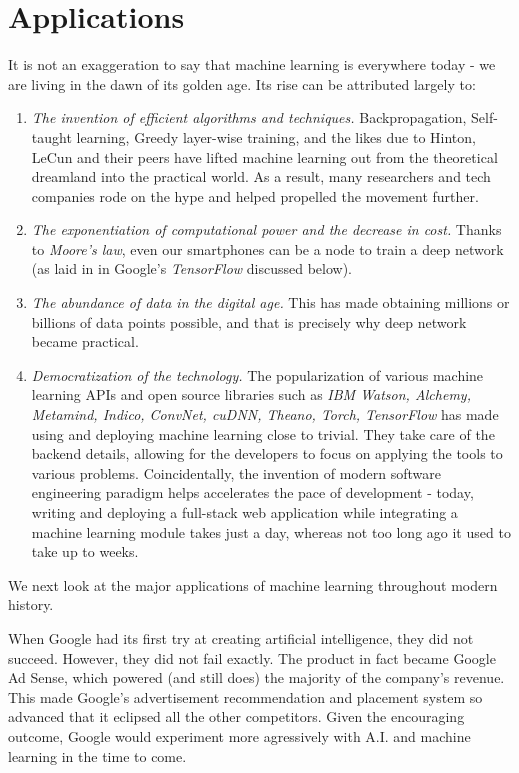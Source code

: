\documentclass[12pt]{article}  %
\begin{document}
\section{Applications}
It is not an exaggeration to say that machine learning is everywhere today - we are living in the dawn of its golden age. Its rise can be attributed largely to:

\begin{enumerate}
	\item \emph{The invention of efficient algorithms and techniques.} Backpropagation, Self-taught learning, Greedy layer-wise training, and the likes due to Hinton, LeCun and their peers have lifted machine learning out from the theoretical dreamland into the practical world. As a result, many researchers and tech companies rode on the hype and helped propelled the movement further.
	\item \emph{The exponentiation of computational power and the decrease in cost.} Thanks to \emph{Moore's law}, even our smartphones can be a node to train a deep network (as laid in in Google's \emph{TensorFlow} discussed below).
	\item \emph{The abundance of data in the digital age.} This has made obtaining millions or billions of data points possible, and that is precisely why deep network became practical.
	\item \emph{Democratization of the technology.} The popularization of various machine learning APIs and open source libraries such as \emph{IBM Watson, Alchemy, Metamind, Indico, ConvNet, cuDNN, Theano, Torch, TensorFlow} has made using and deploying machine learning close to trivial. They take care of the backend details, allowing for the developers to focus on applying the tools to various problems. Coincidentally, the invention of modern software engineering paradigm helps accelerates the pace of development - today, writing and deploying a full-stack web application while integrating a machine learning module takes just a day, whereas not too long ago it used to take up to weeks.
\end{enumerate}


We next look at the major applications of machine learning throughout modern history.

When Google had its first try at creating artificial intelligence, they did not succeed. However, they did not fail exactly. The product in fact became Google Ad Sense, which powered (and still does) the majority of the company's revenue. This made Google's advertisement recommendation and placement system so advanced that it eclipsed all the other competitors. Given the encouraging outcome, Google would experiment more agressively with A.I. and machine learning in the time to come.
\end{document}
